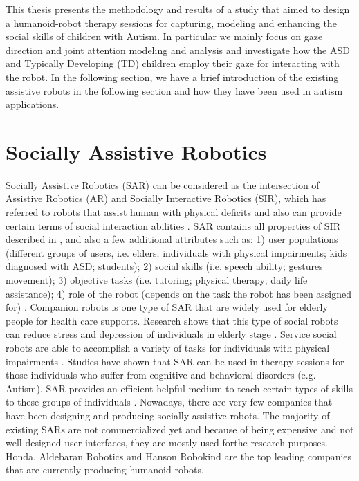 This thesis presents the methodology and results of a study that aimed to design a
humanoid-robot therapy sessions for capturing, modeling and enhancing the social skills
of children with Autism. In particular we mainly focus on gaze direction and joint attention
modeling and analysis and investigate how the ASD and Typically Developing (TD)
children employ their gaze for interacting with the robot. In the following section, we have
a brief introduction of the existing assistive robots in the following section and how they
have been used in autism applications.\\


\section{Socially Assistive Robotics}
Socially Assistive Robotics (SAR) can be considered as the intersection of Assistive
Robotics (AR) and Socially Interactive Robotics (SIR), which has referred to robots that
assist human with physical deficits and also can provide certain terms of social interaction
abilities \cite{DefineSocial2005}. SAR contains all properties of SIR described in \cite{SocialInteract2003}, and also a few additional
attributes such as: 1) user populations (different groups of users, i.e. elders; individuals
with physical impairments; kids diagnosed with ASD; students); 2) social skills (i.e. speech
ability; gestures movement); 3) objective tasks (i.e. tutoring; physical therapy; daily life
assistance); 4) role of the robot (depends on the task the robot has been assigned for) \cite{DefineSocial2005}.
Companion robots \cite{AnalysisFactor2002} is one type of SAR that are widely used for elderly people
for health care supports. Research shows that this type of social robots can reduce stress
and depression of individuals in elderly stage \cite{AnimalAssist2002}. Service social robots are able to
accomplish a variety of tasks for individuals with physical impairments \cite{Fetch2002}. Studies have
shown that SAR can be used in therapy sessions for those individuals who suffer from
cognitive and behavioral disorders (e.g. Autism). SAR provides an efficient helpful
medium to teach certain types of skills to these groups of individuals \cite{RobotPlaymate2002, RollingRobot2002, MobileRobotic2002}.
Nowadays, there are very few companies that have been designing and producing
socially assistive robots. The majority of existing SARs are not commercialized yet and
because of being expensive and not well-designed user interfaces, they are mostly used forthe 
research purposes. Honda, Aldebaran Robotics and Hanson Robokind are the top
leading companies that are currently producing humanoid robots.\\

